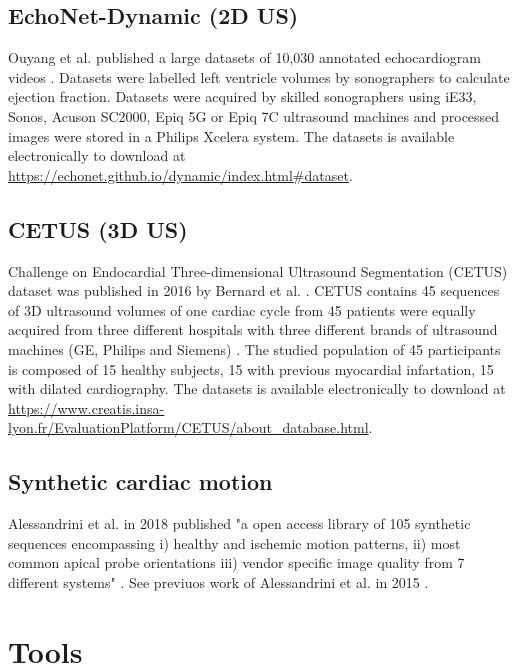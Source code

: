 \subsection{EchoNet-Dynamic (2D US)}
Ouyang et al. published a large datasets of 10,030 annotated echocardiogram videos \cite{ouyang-NeuripsML4H2019, Ouyang-Nature-APR2020}.
Datasets were labelled left ventricle volumes by sonographers to calculate ejection fraction.
Datasets were acquired by skilled sonographers using iE33, Sonos, Acuson SC2000, Epiq 5G or Epiq 7C ultrasound machines and processed images were stored in a Philips Xcelera system.
The datasets is available electronically to download at \url{https://echonet.github.io/dynamic/index.html#dataset}.

\subsection{CETUS (3D US)}
Challenge on Endocardial Three-dimensional Ultrasound Segmentation (CETUS) dataset was published in 2016 by Bernard et al. \cite{bernard2016TMI}.
CETUS contains 45 sequences of 3D ultrasound volumes of one cardiac cycle from 45 patients were equally acquired from three different hospitals with three different brands of ultrasound machines (GE, Philips and Siemens) \cite{bernard2016TMI}.
The studied population of 45 participants is composed of 15 healthy subjects, 15 with previous myocardial infartation, 15 with dilated cardiography.
The datasets is available electronically to download at \url{https://www.creatis.insa-lyon.fr/EvaluationPlatform/CETUS/about_database.html}.

\subsection{Synthetic cardiac motion}
Alessandrini et al. in 2018 published "a open access library of 105 synthetic sequences encompassing i) healthy and ischemic motion patterns, ii) most common apical probe orientations iii) vendor specific image quality from 7 different systems" \cite{alessandrini2018}.
See previuos work of Alessandrini et al. in 2015  \cite{alessandrini2015_isbi}.

\section{Tools}

